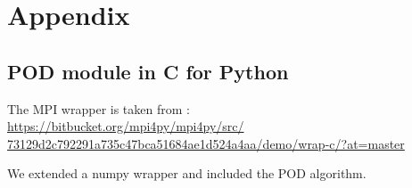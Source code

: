 \chapter{Appendix}
\section{POD module in C for Python}
\label{list:cPODpython}

The MPI wrapper is taken from \cite{DALCIN20051108}:\\
\href{https://bitbucket.org/mpi4py/mpi4py/src/73129d2c792291a735c47bca51684ae1d524a4aa/demo/wrap-c/?at=master}
{https://bitbucket.org/mpi4py/mpi4py/src/ \\73129d2c792291a735c47bca51684ae1d524a4aa/demo/wrap-c/?at=master}

We extended a numpy wrapper and included the POD algorithm.

